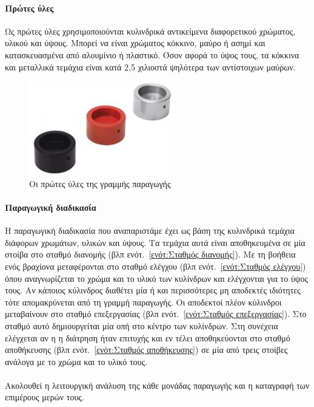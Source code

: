 \documentclass[a4paper,12pt,twoside]{report}
\begin{document}
{			\paragraph{Πρώτες ύλες} {Ως πρώτες ύλες χρησιμοποιούνται κυλινδρικά αντικείμενα διαφορετικού χρώματος, υλικού και ύψους. Μπορεί να είναι χρώματος κόκκινο, μαύρο ή ασημί και κατασκευασμένα από αλουμίνιο ή πλαστικό. Όσον αφορά το ύψος τους, τα κόκκινα και μεταλλικά τεμάχια είναι κατά 2,5 χιλιοστά ψηλότερα των αντίστοιχων μαύρων.
			}
			
			\begin{figure}[hp]
					\centering
					\includegraphics[scale=0.25]{WorkpiecesFesto.png}
					\caption{Οι πρώτες ύλες της γραμμής παραγωγής}
					\label{φωτ:Οι πρώτες ύλες της γραμμής παραγωγής}
			\end{figure}
		
			\paragraph{Παραγωγική διαδικασία} {Η παραγωγική διαδικασία που αναπαριστάμε έχει ως βάση της κυλινδρικά τεμάχια διάφορων χρωμάτων, υλικών και ύψους. Τα τεμάχια αυτά είναι αποθηκευμένα σε μία στοίβα στο σταθμό διανομής {\footnotesize (βλπ ενότ.~\ref{ενότ:Σταθμός διανομής})}. Με τη βοήθεια ενός βραχίονα μεταφέρονται στο σταθμό ελέγχου {\footnotesize (βλπ ενότ.~\ref{ενότ:Σταθμός ελέγχου})} όπου αναγνωρίζεται το χρώμα και το υλικό των κυλίνδρων και ελέγχονται για το ύψος τους. Αν κάποιος κύλινδρος διαθέτει μία ή και περισσότερες μη αποδεκτές ιδιότητες τότε απομακρύνεται από τη γραμμή παραγωγής. Οι αποδεκτοί πλέον κύλινδροι μεταβαίνουν στο σταθμό επεξεργασίας {\footnotesize (βλπ ενότ.~\ref{ενότ:Σταθμός επεξεργασίας})}. Στο σταθμό αυτό δημιουργείται μία οπή στο κέντρο των κυλίνδρων. Στη συνέχεια ελέγχεται αν η η διάτρηση ήταν επιτυχής και εν τέλει αποθηκεύονται στο σταθμό αποθήκευσης {\footnotesize (βλπ ενότ.~\ref{ενότ:Σταθμός αποθήκευσης})} σε μία από τρεις στοίβες ανάλογα με το χρώμα και το υλικό τους. \cite{UMLΕνσωματωμέναΣυστήματα}
			}
			
			\paragraph{} {Ακολουθεί η λειτουργική ανάλυση της κάθε μονάδας παραγωγής και η καταγραφή των επιμέρους μερών τους.}
			}
\end{document}
